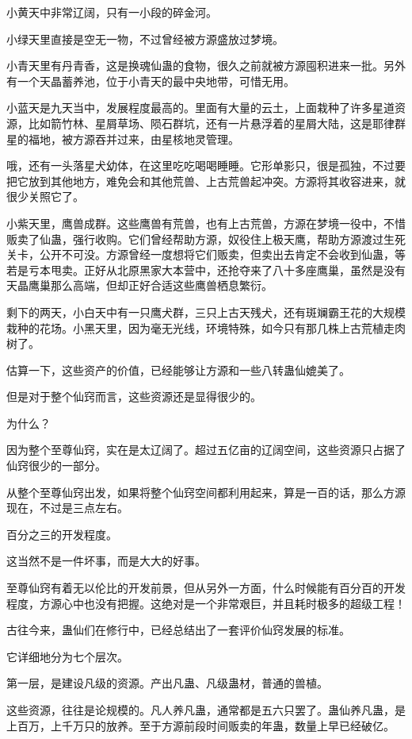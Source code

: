 \begin{this_body}
小黄天中非常辽阔，只有一小段的碎金河。

小绿天里直接是空无一物，不过曾经被方源盛放过梦境。

小青天里有丹青香，这是换魂仙蛊的食物，很久之前就被方源囤积进来一批。另外有一个天晶蓄养池，位于小青天的最中央地带，可惜无用。

小蓝天是九天当中，发展程度最高的。里面有大量的云土，上面栽种了许多星道资源，比如箭竹林、星屑草场、陨石群坑，还有一片悬浮着的星屑大陆，这是耶律群星的福地，被方源吞并过来，由星核地灵管理。

哦，还有一头落星犬幼体，在这里吃吃喝喝睡睡。它形单影只，很是孤独，不过要把它放到其他地方，难免会和其他荒兽、上古荒兽起冲突。方源将其收容进来，就很少关照它了。

小紫天里，鹰兽成群。这些鹰兽有荒兽，也有上古荒兽，方源在梦境一役中，不惜贩卖了仙蛊，强行收购。它们曾经帮助方源，奴役住上极天鹰，帮助方源渡过生死关卡，公开不可没。方源曾经一度想将它们贩卖，但卖出去肯定不会收到仙蛊，等若是亏本甩卖。正好从北原黑家大本营中，还抢夺来了八十多座鹰巢，虽然是没有天晶鹰巢那么高端，但却正好合适这些鹰兽栖息繁衍。

剩下的两天，小白天中有一只鹰犬群，三只上古天残犬，还有斑斓霸王花的大规模栽种的花场。小黑天里，因为毫无光线，环境特殊，如今只有那几株上古荒植走肉树了。

估算一下，这些资产的价值，已经能够让方源和一些八转蛊仙媲美了。

但是对于整个仙窍而言，这些资源还是显得很少的。

为什么？

因为整个至尊仙窍，实在是太辽阔了。超过五亿亩的辽阔空间，这些资源只占据了仙窍很少的一部分。

从整个至尊仙窍出发，如果将整个仙窍空间都利用起来，算是一百的话，那么方源现在，不过是三点左右。

百分之三的开发程度。

这当然不是一件坏事，而是大大的好事。

至尊仙窍有着无以伦比的开发前景，但从另外一方面，什么时候能有百分百的开发程度，方源心中也没有把握。这绝对是一个非常艰巨，并且耗时极多的超级工程！

古往今来，蛊仙们在修行中，已经总结出了一套评价仙窍发展的标准。

它详细地分为七个层次。

第一层，是建设凡级的资源。产出凡蛊、凡级蛊材，普通的兽植。

这些资源，往往是论规模的。凡人养凡蛊，通常都是五六只罢了。蛊仙养凡蛊，是上百万，上千万只的放养。至于方源前段时间贩卖的年蛊，数量上早已经破亿。


\end{this_body}
